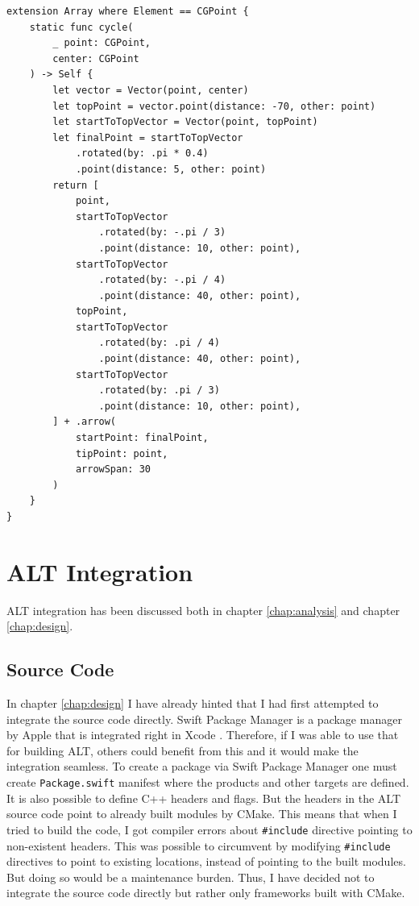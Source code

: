\begin{lstlisting}[caption=Cycle stroke, label=cycle-init]
extension Array where Element == CGPoint {
    static func cycle(
        _ point: CGPoint,
        center: CGPoint
    ) -> Self {
        let vector = Vector(point, center)
        let topPoint = vector.point(distance: -70, other: point)
        let startToTopVector = Vector(point, topPoint)
        let finalPoint = startToTopVector
            .rotated(by: .pi * 0.4)
            .point(distance: 5, other: point)
        return [
            point,
            startToTopVector
                .rotated(by: -.pi / 3)
                .point(distance: 10, other: point),
            startToTopVector
                .rotated(by: -.pi / 4)
                .point(distance: 40, other: point),
            topPoint,
            startToTopVector
                .rotated(by: .pi / 4)
                .point(distance: 40, other: point),
            startToTopVector
                .rotated(by: .pi / 3)
                .point(distance: 10, other: point),
        ] + .arrow(
            startPoint: finalPoint,
            tipPoint: point,
            arrowSpan: 30
        )
    }
}
\end{lstlisting}

\section{ALT Integration}

ALT integration has been discussed both in chapter \ref{chap:analysis} and chapter \ref{chap:design}. 

\subsection{Source Code}
In chapter \ref{chap:design} I have already hinted that I had first attempted to integrate the source code directly. Swift Package Manager is a package manager by Apple that is integrated right in Xcode \cite{spm}. Therefore, if I was able to use that for building ALT, others could benefit from this and it would make the integration seamless. To create a package via Swift Package Manager one must create \lstinline{Package.swift} manifest where the products and other targets are defined. It is also possible to define C++ headers and flags. But the headers in the ALT source code point to already built modules by CMake. This means that when I tried to build the code, I got compiler errors about \lstinline{#include} directive pointing to non-existent headers. This was possible to circumvent by modifying \lstinline{#include} directives to point to existing locations, instead of pointing to the built modules. But doing so would be a maintenance burden. Thus, I have decided not to integrate the source code directly but rather only frameworks built with CMake.

